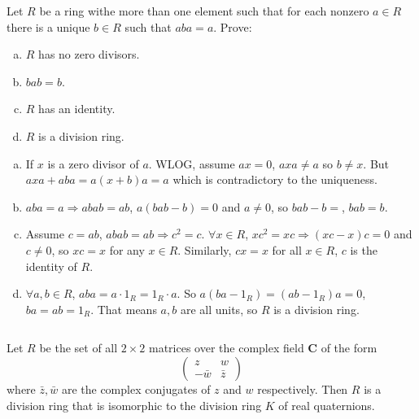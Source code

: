 $$ $$

\begin{ex}
    Let $R$ be a ring withe more than one element such that for each nonzero $a\in R$ there is a unique $b\in R$ such that $aba=a$. Prove:
    \begin{enumerate}[(a)]
        \item $R$ has no zero divisors.
        \item $bab=b$.
        \item $R$ has an identity.
        \item $R$ is a division ring.
    \end{enumerate}
\end{ex}

\begin{answer}
    \begin{enumerate}[(a)]
        \item If $x$ is a zero divisor of $a$. WLOG, assume $ax=0$, $axa\neq a$ so $b\neq x$. But $axa+aba=a(x+b)a=a$ which is contradictory to the uniqueness.
        \item $aba=a\Rightarrow abab=ab$, $a(bab-b)=0$ and $a\neq 0$, so $bab-b=$, $bab=b$.
        \item Assume $c=ab$, $abab=ab\Rightarrow c^{2}=c$. $\forall x\in R$, $xc^{2}=xc\Rightarrow (xc-x)c=0$ and $c\neq 0$, so $xc=x$ for any $x\in R$. Similarly, $cx=x$ for all $x\in R$, $c$ is the identity of $R$.
        \item $\forall a,b\in R$, $aba=a\cdot 1_{R}=1_{R}\cdot a$. So $a(ba-1_{R})=(ab-1_{R})a=0$, $ba=ab=1_{R}$. That means $a, b$ are all units, so $R$ is a division ring.
    \end{enumerate}
\end{answer}

$$ $$

\begin{ex}
    Let $R$ be the set of all $2\times 2$ matrices over the complex field $\mathbf{C}$ of the form \[\begin{pmatrix}
        z& w\\ -\bar{w}&\bar{z}
    \end{pmatrix}\]where $\bar{z}, \bar{w}$ are the complex conjugates of $z$ and $w$ respectively. Then $R$ is a division ring that is isomorphic to the division ring $K$ of real quaternions.
\end{ex}

